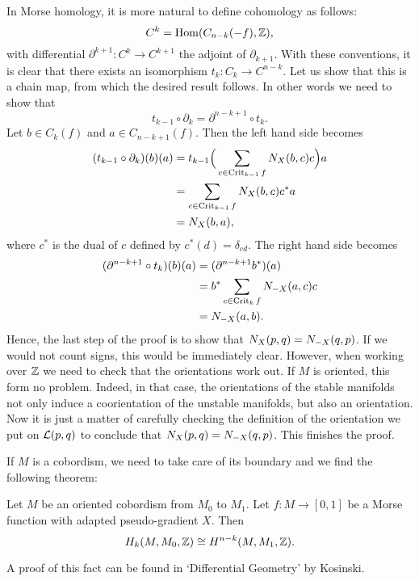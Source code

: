 \begin{myproof}
    In Morse homology, it is more natural to define cohomology as follows:
    \[
        C^{k} = \operatorname{Hom}(C_{n-k}(-f), \mathbb{Z})
    ,\]
    with differential $\partial^{k+1}:C^{k} \to  C^{k+1}$ the adjoint of $\partial_{k+1}$.
    With these conventions, it is clear that there exists an isomorphism $t_k: C_k \to  C^{n-k}$. 
    Let us show that this is a chain map, from which the desired result follows.
    In other words we need to show that
    \[
    t_{k-1}  \circ  \partial_k = \partial^{n-k+1}  \circ  t_k
    .\] 
    Let $b \in C_k(f)$ and $a \in C_{n-k+1}(f)$.
    Then the left hand side becomes
    \begin{align*}
        (t_{k-1}  \circ  \partial_k)(b)(a)
        &= t_{k-1}\Big(\sum_{c \in \operatorname{Crit}_{k-1}f} N_{X}(b, c) c\Big) a \\
        &= \sum_{c \in \operatorname{Crit}_{k-1}f} N_{X}(b, c) c^{*} a\\
        &= N_{X}(b, a)
    ,\end{align*} 
    where $c^{*}$ is the dual of $c$ defined by $c^{*}(d) = \delta_{cd}$.
    The right hand side becomes
    \begin{align*}
        (\partial^{n-k+1}  \circ  t_k)(b)(a) &= (\partial^{n-k+1}  b^{*})(a)\\
                                          &= b^{*} \sum_{c \in \operatorname{Crit}_k f} N_{-X}(a, c) c\\
                                          &= N_{-X}(a, b)
    .\end{align*} 
    Hence, the last step of the proof is to show that $N_{X}(p, q) = N_{-X}(q, p)$.
    If we would not count signs, this would be immediately clear.
    However, when working over $\mathbb{Z}$ we need to check that the orientations work out.
    If $M$ is oriented, this form no problem.
    Indeed, in that case, the orientations of the stable manifolds not only induce a coorientation of the unstable manifolds, but also an orientation.
    Now it is just a matter of carefully checking the definition of the orientation we put on $\mathcal L(p, q)$ to conclude that $N_{X}(p, q) = N_{-X}(q, p)$.
    This finishes the proof.
\end{myproof}

If $M$ is a cobordism, we need to take care of its boundary and we find the following theorem:
\begin{theorem}
    Let $M$ be an oriented cobordism from  $M_0$ to $M_1$.
    Let $f: M \to  [0,1]$ be a Morse function with adapted pseudo-gradient $X$.
    Then
     \[
         H_k(M, M_0, \mathbb{Z}) \cong H^{n-k}(M, M_1, \mathbb{Z})
    .\] 
\end{theorem}
A proof of this fact can be found in `Differential Geometry' by Kosinski.

